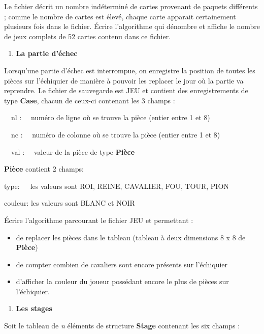 {
{Le fichier décrit un nombre indéterminé de
cartes provenant de paquets différents ; comme le nombre de cartes est
élevé, chaque carte apparait certainement plusieurs fois dans le
fichier. Écrire} l’algorithme qui dénombre et affiche le nombre de jeux
complets de 52 cartes contenu dans ce fichier.}

\liststyleExercice
\setcounter{saveenum}{\value{enumi}}
\begin{enumerate}
\setcounter{enumi}{\value{saveenum}}
\item {\sffamily\bfseries
La partie d’échec}
\end{enumerate}
{
Lorsqu’une partie d’échec est interrompue, on enregistre la position de
toutes les pièces sur l’échiquier de manière à pouvoir les replacer le
jour où la partie va reprendre. Le fichier de sauvegarde est JEU et
contient des enregistrements de type \textbf{Case}, chacun de ceux-ci
contenant les 3 champs :}

{
\ \ nl : \ \ numéro de ligne où se trouve la pièce (entier entre 1 et
8)}

{
\ \ nc : \ \ numéro de colonne où se trouve la pièce (entier entre 1 et
8)}

{
\ \ val : \ \ valeur de la pièce de type \textbf{Pièce}}


\bigskip

{
\textbf{Pièce} contient 2 champs: }

{
type:\ \  \ les valeurs sont ROI, REINE, CAVALIER, FOU, TOUR, PION}

{
couleur: les valeurs sont BLANC et NOIR}


\bigskip

{
Écrire l’algorithme parcourant le fichier JEU et permettant :}

\liststyleListv
\begin{itemize}
\item {
de replacer les pièces dans le tableau 
(tableau à deux dimensions 8 x 8 de \textbf{Pièce})}
\item {
de compter combien de cavaliers sont encore présents sur l’échiquier}
\item {
d’afficher la couleur du joueur possédant encore le plus de pièces sur
l’échiquier.}
\end{itemize}
\liststyleExercice
\begin{enumerate}
\item {\sffamily\bfseries
Les stages}
\end{enumerate}
{
Soit le tableau  de \textit{n} éléments de
structure \textbf{Stage} contenant les six champs : \ \ }

